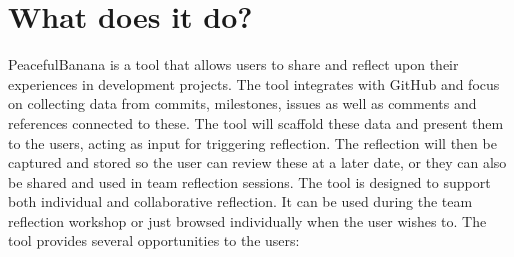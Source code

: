 \section{What does it do?}
PeacefulBanana is a tool that allows users to share and reflect upon their experiences in development projects. The tool integrates with GitHub and focus on collecting data from commits, milestones, issues as well as comments and references connected to these. The tool will scaffold these data and present them to the users, acting as input for triggering reflection. The reflection will then be captured and stored so the user can review these at a later date, or they can also be shared and used in team reflection sessions. The tool is designed to support both individual and collaborative reflection. It can be used during the team reflection workshop or just browsed individually when the user wishes to. The tool provides several opportunities to the users:
